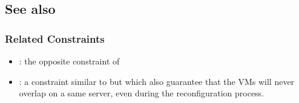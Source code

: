 \subsection{See also}

\subsubsection{Related Constraints}
\begin{itemize}
\item {}: the opposite constraint of 
\item {}: a constraint similar to 
but which also guarantee that the VMs will never overlap on a same server, even during the reconfiguration process.
\end{itemize}

